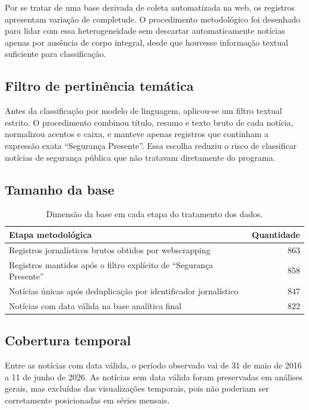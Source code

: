 \documentclass[12pt,a4paper]{article}
\begin{document}
Por se tratar de uma base derivada de coleta automatizada na web, os registros apresentam variação de completude. O procedimento metodológico foi desenhado para lidar com essa heterogeneidade sem descartar automaticamente notícias apenas por ausência de corpo integral, desde que houvesse informação textual suficiente para classificação.

\subsection{Filtro de pertinência temática}

Antes da classificação por modelo de linguagem, aplicou-se um filtro textual estrito. O procedimento combinou título, resumo e texto bruto de cada notícia, normalizou acentos e caixa, e manteve apenas registros que continham a expressão exata ``Segurança Presente''. Essa escolha reduziu o risco de classificar notícias de segurança pública que não tratavam diretamente do programa.

\subsection{Tamanho da base}

\begin{table}[H]
\centering
\begin{tabular}{p{10cm}r}
\toprule
\textbf{Etapa metodológica} & \textbf{Quantidade} \\
\midrule
Registros jornalísticos brutos obtidos por webscrapping & 863 \\
Registros mantidos após o filtro explícito de ``Segurança Presente'' & 858 \\
Notícias únicas após deduplicação por identificador jornalístico & 847 \\
Notícias com data válida na base analítica final & 822 \\
\bottomrule
\end{tabular}
\caption{Dimensão da base em cada etapa do tratamento dos dados.}
\end{table}

\subsection{Cobertura temporal}

Entre as notícias com data válida, o período observado vai de 31 de maio de 2016 a 11 de junho de 2026. As notícias sem data válida foram preservadas em análises gerais, mas excluídas das visualizações temporais, pois não poderiam ser corretamente posicionadas em séries mensais.
\end{document}
